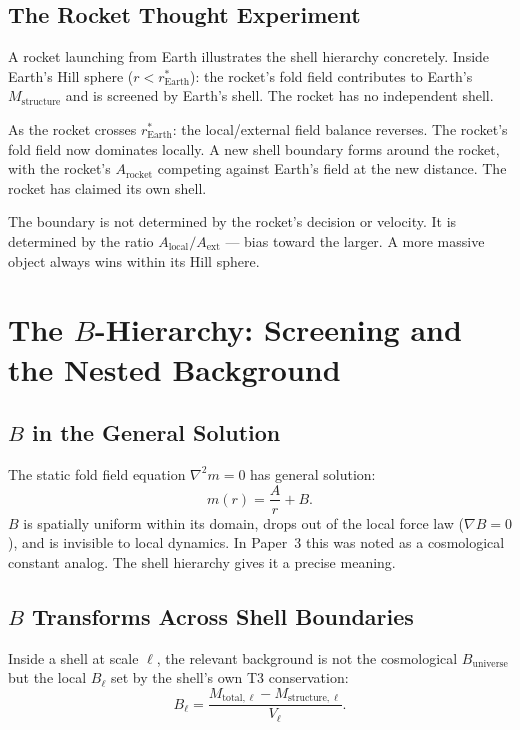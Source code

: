 \documentclass[12pt]{article}
\begin{document}
\subsection{The Rocket Thought Experiment}

A rocket launching from Earth illustrates the shell hierarchy concretely.
Inside Earth's Hill sphere ($r < r^*_{\mathrm{Earth}}$): the rocket's
fold field contributes to Earth's $M_{\mathrm{structure}}$ and is screened
by Earth's shell. The rocket has no independent shell.

As the rocket crosses $r^*_{\mathrm{Earth}}$: the local/external field
balance reverses. The rocket's fold field now dominates locally. A new
shell boundary forms around the rocket, with the rocket's $A_{\mathrm{rocket}}$
competing against Earth's field at the new distance. The rocket has claimed
its own shell.

The boundary is not determined by the rocket's decision or velocity.
It is determined by the ratio $A_{\mathrm{local}}/A_{\mathrm{ext}}$
--- bias toward the larger. A more massive object always wins within its
Hill sphere.

\section{The $B$-Hierarchy: Screening and the Nested Background}

\subsection{$B$ in the General Solution}

The static fold field equation $\nabla^2 m = 0$ has general solution:
\begin{equation}
  m(r) = \frac{A}{r} + B.
\end{equation}
$B$ is spatially uniform within its domain, drops out of the local force
law ($\nabla B = 0$), and is invisible to local dynamics. In Paper~3
this was noted as a cosmological constant analog. The shell hierarchy
gives it a precise meaning.

\subsection{$B$ Transforms Across Shell Boundaries}

Inside a shell at scale $\ell$, the relevant background is not the
cosmological $B_{\mathrm{universe}}$ but the local $B_\ell$ set by
the shell's own T3 conservation:
\begin{equation}
  B_\ell = \frac{M_{\mathrm{total},\ell} - M_{\mathrm{structure},\ell}}{V_\ell}.
  \label{eq:B_local}
\end{equation}
\end{document}
